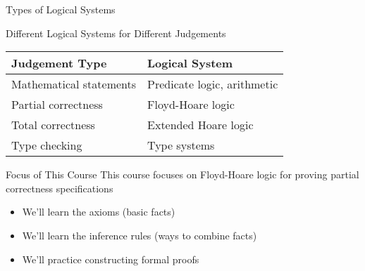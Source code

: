 \begin{frame}{Types of Logical Systems}
    \begin{block}{Different Logical Systems for Different Judgements}
        \begin{tabular}{|l|l|}
            \hline
            \textbf{Judgement Type} & \textbf{Logical System} \\
            \hline
            Mathematical statements & Predicate logic, arithmetic \\
            Partial correctness & Floyd-Hoare logic \\
            Total correctness & Extended Hoare logic \\
            Type checking & Type systems \\
            \hline
        \end{tabular}
    \end{block}
    
    \begin{block}{Focus of This Course}
        This course focuses on Floyd-Hoare logic for proving partial correctness specifications
        \begin{itemize}
            \item We'll learn the axioms (basic facts)
            \item We'll learn the inference rules (ways to combine facts)
            \item We'll practice constructing formal proofs
        \end{itemize}
    \end{block}
\end{frame}